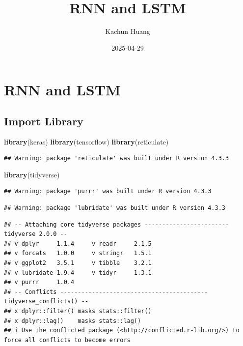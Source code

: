 \documentclass[
]{article}
\title{RNN and LSTM}
\author{Kachun Huang}
\date{2025-04-29}
\newenvironment{Shaded}{\begin{snugshade}}{\end{snugshade}}
\newcommand{\FunctionTok}[1]{\textcolor[rgb]{0.13,0.29,0.53}{\textbf{#1}}}
\newcommand{\NormalTok}[1]{#1}
\begin{document}
\maketitle

\section{RNN and LSTM}\label{rnn-and-lstm}

\subsection{Import Library}\label{import-library}

\begin{Shaded}
\begin{Highlighting}[]
\FunctionTok{library}\NormalTok{(keras)}
\FunctionTok{library}\NormalTok{(tensorflow)}
\FunctionTok{library}\NormalTok{(reticulate)}
\end{Highlighting}
\end{Shaded}

\begin{verbatim}
## Warning: package 'reticulate' was built under R version 4.3.3
\end{verbatim}

\begin{Shaded}
\begin{Highlighting}[]
\FunctionTok{library}\NormalTok{(tidyverse)}
\end{Highlighting}
\end{Shaded}

\begin{verbatim}
## Warning: package 'purrr' was built under R version 4.3.3
\end{verbatim}

\begin{verbatim}
## Warning: package 'lubridate' was built under R version 4.3.3
\end{verbatim}

\begin{verbatim}
## -- Attaching core tidyverse packages ------------------------ tidyverse 2.0.0 --
## v dplyr     1.1.4     v readr     2.1.5
## v forcats   1.0.0     v stringr   1.5.1
## v ggplot2   3.5.1     v tibble    3.2.1
## v lubridate 1.9.4     v tidyr     1.3.1
## v purrr     1.0.4     
## -- Conflicts ------------------------------------------ tidyverse_conflicts() --
## x dplyr::filter() masks stats::filter()
## x dplyr::lag()    masks stats::lag()
## i Use the conflicted package (<http://conflicted.r-lib.org/>) to force all conflicts to become errors
\end{verbatim}
\end{document}
